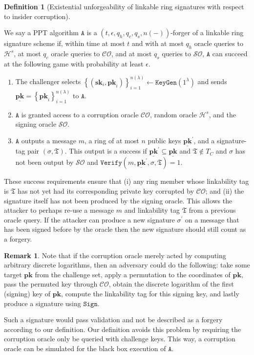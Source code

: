\documentclass{mrl}
\theoremstyle{plain}
\theoremstyle{definition}
\newtheorem{remark}{Remark}[section]
\newtheorem{defn}{Definition}[section]
\begin{document}
\begin{defn}[Existential unforgeability of linkable ring signatures with respect to insider corruption]\label{def:unf}

We say a PPT algorithm $\texttt{A}$  is a $(t, \epsilon, q_h, q_c, q_s,  n(-))$-forger of a linkable ring signature scheme if, within time at most $t$ and with at most $q_h$ oracle queries to $\mathcal{H}^s$, at most $q_c$ oracle queries to $\mathcal{CO}$, and at most $q_s$ queries to $\mathcal{SO}$, $\texttt{A}$ can succeed at the following game with probability at least $\epsilon$.
\begin{enumerate}
\item The challenger selects $\left\{(\textbf{sk}_i, \textbf{pk}_i)\right\}_{i=1}^{n(\lambda)} \leftarrow \texttt{KeyGen}(1^\lambda)$ and sends $\underline{\textbf{pk}} = \left\{\textbf{pk}_i\right\}_{i=1}^{n(\lambda)}$ to $\texttt{A}$. 

\item $\texttt{A}$ is granted access to a corruption oracle $\mathcal{CO}$, random oracle $\mathcal{H}^s$, and the signing oracle $\mathcal{SO}$.

\item $\texttt{A}$ outputs a message $m$, a ring of at most $n$ public keys $\underline{\textbf{pk}}^\prime$, and a signature-tag pair $(\sigma, \mathfrak{T})$. This output is a success if $\underline{\textbf{pk}}^\prime \subseteq \underline{\textbf{pk}}$ and $\mathfrak{T} \notin T_C$ and $\sigma$ has not been output by $\mathcal{SO}$ and $\texttt{Verify}(m, \underline{\textbf{pk}}^\prime, \sigma, \mathfrak{T}) = 1$.

\end{enumerate}
\end{defn}

These success requirements ensure that (i) any ring member whose linkability tag is $\mathfrak{T}$ has not yet had its corresponding private key corrupted by $\mathcal{CO}$; and (ii) the signature itself has not been produced by the signing oracle. This allows the attacker to perhaps re-use a message $m$ and linkability tag $\mathfrak{T}$ from a previous oracle query. If the attacker can produce a new signature $\sigma^\prime$ on a message that has been signed before by the oracle then the new signature should still count as a forgery.


\begin{remark}
Note that if the corruption oracle merely acted by computing arbitrary discrete logarithms, then an adversary could do the following: take some target $\textbf{pk}$ from the challenge set, apply a permutation to the coordinates of $\textbf{pk}$, pass the permuted key through $\mathcal{CO}$, obtain the discrete logarithm of the first (signing) key of $\textbf{pk}$, compute the linkability tag for this signing key, and lastly produce a signature using $\texttt{Sign}$. 

Such a signature would pass validation and not be described as a forgery according to our definition. Our definition avoids this problem by requiring the corruption oracle only be queried with challenge keys. This way, a corruption oracle can be simulated for the black box execution of $\texttt{A}$.
\end{remark}
\end{document}
